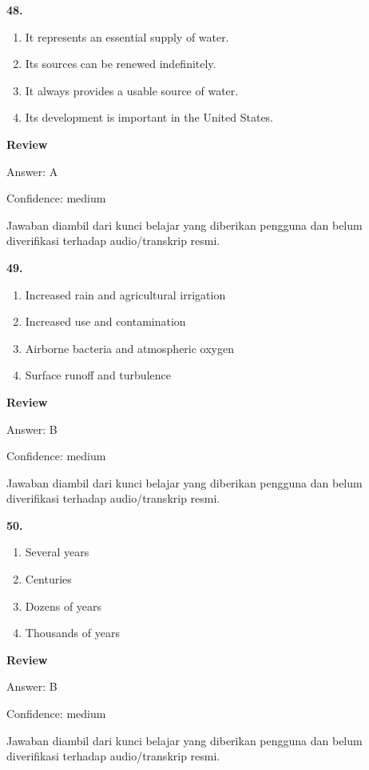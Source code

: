 \documentclass[12pt]{article}
\begin{document}
\noindent\textbf{48.}
\begin{enumerate}[label=(\Alph*),leftmargin=*,itemsep=0.2em]
\item It represents an essential supply of water.
\item Its sources can be renewed indefinitely.
\item It always provides a usable source of water.
\item Its development is important in the United States.
\end{enumerate}
\par
\begingroup
\setlength{\parskip}{0pt}
\setlength{\parindent}{0pt}
\textbf{Review}\par
Answer: A\par
Confidence: medium\par
Jawaban diambil dari kunci belajar yang diberikan pengguna dan belum diverifikasi terhadap audio/transkrip resmi.\par
\endgroup
\par
\vspace{0.25\baselineskip}
\noindent\textbf{49.}
\begin{enumerate}[label=(\Alph*),leftmargin=*,itemsep=0.2em]
\item Increased rain and agricultural irrigation
\item Increased use and contamination
\item Airborne bacteria and atmospheric oxygen
\item Surface runoff and turbulence
\end{enumerate}
\par
\begingroup
\setlength{\parskip}{0pt}
\setlength{\parindent}{0pt}
\textbf{Review}\par
Answer: B\par
Confidence: medium\par
Jawaban diambil dari kunci belajar yang diberikan pengguna dan belum diverifikasi terhadap audio/transkrip resmi.\par
\endgroup
\par
\vspace{0.25\baselineskip}
\noindent\textbf{50.}
\begin{enumerate}[label=(\Alph*),leftmargin=*,itemsep=0.2em]
\item Several years
\item Centuries
\item Dozens of years
\item Thousands of years
\end{enumerate}
\par
\begingroup
\setlength{\parskip}{0pt}
\setlength{\parindent}{0pt}
\textbf{Review}\par
Answer: B\par
Confidence: medium\par
Jawaban diambil dari kunci belajar yang diberikan pengguna dan belum diverifikasi terhadap audio/transkrip resmi.\par
\endgroup
\par
\vspace{0.25\baselineskip}
\end{document}
